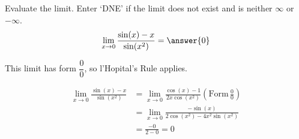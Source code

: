 \documentclass{ximera}
\author{Emma Smith Zbarsky \and Bobby Ramsey}
\begin{document}
\begin{exercise}

Evaluate the limit. Enter `DNE' if the limit does not exist and is neither $\infty$ or $-\infty$. 
\[\lim_{x\to 0} \frac{\sin(x)-x}{\sin(x^2)} = \answer{0}\]


\begin{hint}
	This limit has form $\dfrac{0}{0}$, so l'Hopital's Rule applies.
\end{hint}


\begin{hint}
	\begin{align*}
		\lim_{x\to 0} \frac{\sin(x)-x}{\sin(x^2)} &= \lim_{x\to 0} \frac{\cos(x)-1}{2x\cos(x^2)} \left(\text{Form} \, \frac{0}{0}\right) \\
			&= \lim_{x\to 0} \frac{-\sin(x)}{2\cos(x^2)-4x^2\sin(x^2)} \\
			&= \frac{-0}{2-0} = 0 
	\end{align*}
\end{hint}



\end{exercise}
\end{document}
